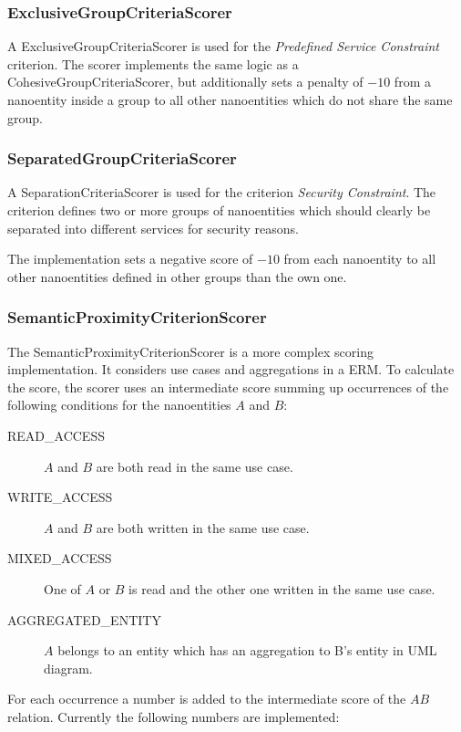 \subsubsection{ExclusiveGroupCriteriaScorer}

A ExclusiveGroupCriteriaScorer is used for the \textit{Predefined Service Constraint} criterion. The scorer implements the same logic as a CohesiveGroupCriteriaScorer, but additionally sets a penalty of $-10$ from a nanoentity inside a group to all other nanoentities which do not share the same group.

\subsubsection{SeparatedGroupCriteriaScorer}

A SeparationCriteriaScorer is used for the criterion \textit{Security Constraint}. The criterion defines two or more groups of nanoentities which should clearly be separated into different services for security reasons. 

The implementation sets a negative score of $-10$ from each nanoentity to all other nanoentities defined in other groups than the own one. 

\subsubsection{SemanticProximityCriterionScorer}

The SemanticProximityCriterionScorer is a more complex scoring implementation. It considers use cases and aggregations in a \gls{ERM}. To calculate the score, the scorer uses an intermediate score summing up occurrences of the following conditions for the nanoentities $A$ and $B$:

\begin{description}
	\item [READ\_ACCESS] $A$ and $B$ are both read in the same use case.
	\item [WRITE\_ACCESS] $A$ and $B$ are both written in the same use case.
	\item [MIXED\_ACCESS] One of $A$ or $B$ is read and the other one written in the same use case.
	\item [AGGREGATED\_ENTITY] $A$ belongs to an entity which has an aggregation to B's entity in UML diagram. 
\end{description}

For each occurrence a number is added to the intermediate score of the $AB$ relation. Currently the following numbers are implemented:

